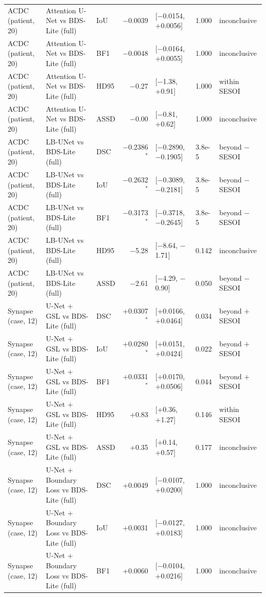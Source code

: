 \begin{tabular}{lllrlll}
ACDC (patient, 20) & Attention U-Net vs BDS-Lite (full) & IoU & $-$0.0039 & [$-$0.0154, +0.0056] & 1.000 & inconclusive \\
ACDC (patient, 20) & Attention U-Net vs BDS-Lite (full) & BF1 & $-$0.0048 & [$-$0.0164, +0.0055] & 1.000 & inconclusive \\
ACDC (patient, 20) & Attention U-Net vs BDS-Lite (full) & HD95 & $-$0.27 & [$-$1.38, +0.91] & 1.000 & within SESOI \\
ACDC (patient, 20) & Attention U-Net vs BDS-Lite (full) & ASSD & $-$0.00 & [$-$0.81, +0.62] & 1.000 & inconclusive \\
ACDC (patient, 20) & LB-UNet vs BDS-Lite (full) & DSC & $-$0.2386$^{*}$ & [$-$0.2890, $-$0.1905] & 3.8e-5 & beyond $-$SESOI \\
ACDC (patient, 20) & LB-UNet vs BDS-Lite (full) & IoU & $-$0.2632$^{*}$ & [$-$0.3089, $-$0.2181] & 3.8e-5 & beyond $-$SESOI \\
ACDC (patient, 20) & LB-UNet vs BDS-Lite (full) & BF1 & $-$0.3173$^{*}$ & [$-$0.3718, $-$0.2645] & 3.8e-5 & beyond $-$SESOI \\
ACDC (patient, 20) & LB-UNet vs BDS-Lite (full) & HD95 & $-$5.28 & [$-$8.64, $-$1.71] & 0.142 & inconclusive \\
ACDC (patient, 20) & LB-UNet vs BDS-Lite (full) & ASSD & $-$2.61 & [$-$4.29, $-$0.90] & 0.050 & beyond $-$SESOI \\
\midrule
Synapse (case, 12) & U-Net + GSL vs BDS-Lite (full) & DSC & +0.0307$^{*}$ & [+0.0166, +0.0464] & 0.034 & beyond $+$SESOI \\
Synapse (case, 12) & U-Net + GSL vs BDS-Lite (full) & IoU & +0.0280$^{*}$ & [+0.0151, +0.0424] & 0.022 & beyond $+$SESOI \\
Synapse (case, 12) & U-Net + GSL vs BDS-Lite (full) & BF1 & +0.0331$^{*}$ & [+0.0170, +0.0506] & 0.044 & beyond $+$SESOI \\
Synapse (case, 12) & U-Net + GSL vs BDS-Lite (full) & HD95 & +0.83 & [+0.36, +1.27] & 0.146 & within SESOI \\
Synapse (case, 12) & U-Net + GSL vs BDS-Lite (full) & ASSD & +0.35 & [+0.14, +0.57] & 0.177 & inconclusive \\
Synapse (case, 12) & U-Net + Boundary Loss vs BDS-Lite (full) & DSC & +0.0049 & [$-$0.0107, +0.0200] & 1.000 & inconclusive \\
Synapse (case, 12) & U-Net + Boundary Loss vs BDS-Lite (full) & IoU & +0.0031 & [$-$0.0127, +0.0183] & 1.000 & inconclusive \\
Synapse (case, 12) & U-Net + Boundary Loss vs BDS-Lite (full) & BF1 & +0.0060 & [$-$0.0104, +0.0216] & 1.000 & inconclusive \\

\end{tabular}
